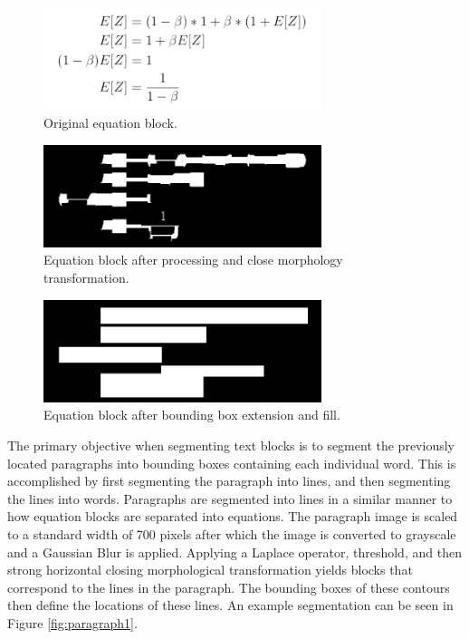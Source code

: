 \documentclass[10pt]{IEEEtran}
\begin{document}
\begin{figure}[h]
  \centering
    \includegraphics[width=3.2in]{eqblock1.png}
  \caption{Original equation block.}
  \label{fig:eqblock1}
\end{figure}

\begin{figure}[h]
  \centering
    \includegraphics[width=3.2in]{eqblock1-morph.png}
  \caption{Equation block after processing and close morphology transformation.}
  \label{fig:eqblock2}
\end{figure}

\begin{figure}[h]
  \centering
    \includegraphics[width=3.2in]{eqblock1-morph2.png}
  \caption{Equation block after bounding box extension and fill.}
  \label{fig:eqblock3}
\end{figure}

The primary objective when segmenting text blocks is to segment the previously located paragraphs into bounding boxes containing each individual word. This is accomplished by first segmenting the paragraph into lines, and then segmenting the lines into words. Paragraphs are segmented into lines in a similar manner to how equation blocks are separated into equations. The paragraph image is scaled to a standard width of 700 pixels after which the image is converted to grayscale and a Gaussian Blur is applied. Applying a Laplace operator, threshold, and then strong horizontal closing morphological transformation yields blocks that correspond to the lines in the paragraph. The bounding boxes of these contours then define the locations of these lines. An example segmentation can be seen in Figure \ref{fig:paragraph1}.
\end{document}
